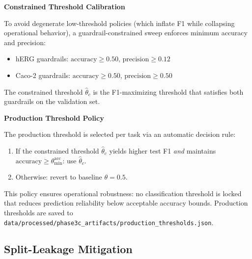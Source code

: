 \documentclass[a4paper,11pt,twoside]{report}
\begin{document}
\noindent\textbf{Constrained Threshold Calibration}\par\medskip

To avoid degenerate low-threshold policies (which inflate F1 while collapsing operational behavior), a guardrail-constrained sweep enforces minimum accuracy and precision:
\begin{itemize}
  \item hERG guardrails: $\text{accuracy} \geq 0.50$, $\text{precision} \geq 0.12$
  \item Caco-2 guardrails: $\text{accuracy} \geq 0.50$, $\text{precision} \geq 0.50$
\end{itemize}
The constrained threshold $\hat{\theta}_c$ is the F1-maximizing threshold that satisfies both guardrails on the validation set.

\noindent\textbf{Production Threshold Policy}\par\medskip

The production threshold is selected per task via an automatic decision rule:
\begin{enumerate}
  \item If the constrained threshold $\hat{\theta}_c$ yields higher test F1 \emph{and} maintains $\text{accuracy} \geq \theta_{\min}^{\text{acc}}$: use $\hat{\theta}_c$.
  \item Otherwise: revert to baseline $\theta = 0.5$.
\end{enumerate}
This policy ensures operational robustness: no classification threshold is locked that reduces prediction reliability below acceptable accuracy bounds. Production thresholds are saved to \texttt{data/processed/phase3c\_artifacts/production\_thresholds.json}.

\subsection{Split-Leakage Mitigation}
\end{document}
